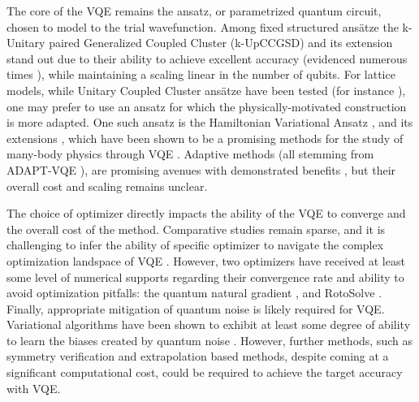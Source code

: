 \documentclass[a4paper,fleqn]{cas-sc}
\begin{document}
The core of the VQE remains the ansatz, or parametrized quantum circuit, chosen to model to the trial wavefunction. Among fixed structured ans\"atze the k-Unitary paired Generalized Coupled Cluster (k-UpCCGSD) \cite{Lee2019} and its extension \cite{Kottmann2021_1} stand out due to their ability to achieve excellent accuracy (evidenced numerous times \cite{Grimsley2019_UCC_Review, Lee2019, GreeneDiniz2020, Kottmann2021_1, Sokolov2020}), while maintaining a scaling linear in the number of qubits. For lattice models, while Unitary Coupled Cluster ans\"atze have been tested (for instance \cite{Sokolov2020}), one may prefer to use an ansatz for which the physically-motivated construction is more adapted. One such ansatz is the Hamiltonian Variational Ansatz \cite{Wecker2015, Wiersema2020}, and its extensions \cite{Babbush2018, Choquette2021}, which have been shown to be a promising methods for the study of many-body physics through VQE \cite{Wiersema2020, Babbush2018, Choquette2021}. Adaptive methods (all stemming from ADAPT-VQE \cite{Grimsley2019}), are promising avenues with demonstrated benefits \cite{Claudino2020}, but their overall cost and scaling remains unclear. 

The choice of optimizer directly impacts the ability of the VQE to converge and the overall cost of the method. Comparative studies remain sparse, and it is challenging to infer the ability of specific optimizer to navigate the complex optimization landspace of VQE \cite{Bittel2021}. However, two optimizers have received at least some level of numerical supports regarding their convergence rate and ability to avoid optimization pitfalls: the quantum natural gradient \cite{amari_natural_1998,martens_new_2020,wierichs_avoiding_2020}, and RotoSolve \cite{nakanishi_sequential_2020,ostaszewskiStructureOptimizationParameterized2021}. Finally, appropriate mitigation of quantum noise is likely required for VQE. Variational algorithms have been shown to exhibit at least some degree of ability to learn the biases created by quantum noise \cite{mccleanTheoryVariationalHybrid2015, Enrico2021EvaluatingNoiseResilience,Enrico2020NoiseInducedBreakingOfSymmetries}. However, further methods, such as symmetry verification and extrapolation based methods, despite coming at a significant computational cost, could be required to achieve the target accuracy with VQE. 
\end{document}
